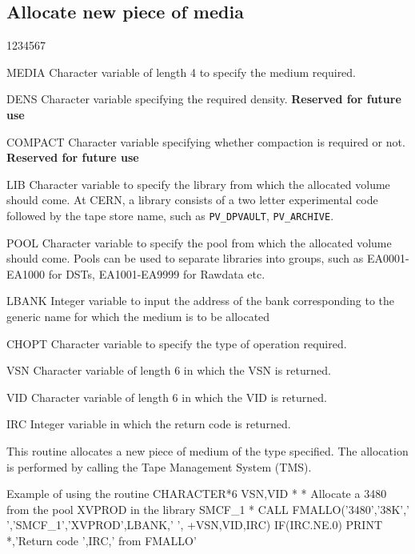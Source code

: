 \subsection{Allocate new piece of media}
\begin{DLtt}{1234567}
\item[MEDIA]
Character variable of length 4 to specify the medium required.
\item[DENS]
Character variable specifying the required density.
{\bf Reserved for future use}
\item[COMPACT]
Character variable specifying whether compaction is required or not.
{\bf Reserved for future use}
\item[LIB]
Character variable to specify the library from which
the allocated volume should come.
At CERN, a library consists of a two letter experimental code
followed by the tape store name, such as {\tt PV\_DPVAULT},
{\tt PV\_ARCHIVE}.
\item[POOL]
Character variable to specify the pool from which
the allocated volume should come.
Pools can be used to separate libraries into groups, such
as EA0001-EA1000 for DSTs, EA1001-EA9999 for Rawdata etc.
\item[LBANK]
Integer variable to input the address of the bank corresponding
to the generic name for which the medium is to be allocated
\item[CHOPT]
Character variable to specify the type of operation required.
\item[VSN]
Character variable of length 6 in which the VSN is returned.
\item[VID]
Character variable of length 6 in which the VID is returned.
\item[IRC]
Integer variable in which the return code is returned.
\end{DLtt}
\par
{}
This routine allocates a new piece of medium of the type
specified. The allocation is performed by calling the
Tape Management System (TMS).
\begin{XMPt}{Example of using the routine \protect{}}
      CHARACTER*6 VSN,VID
*
*     Allocate a 3480 from the pool XVPROD in the library SMCF_1
*
      CALL FMALLO('3480','38K',' ','SMCF_1','XVPROD',LBANK,' ',
     +VSN,VID,IRC)
      IF(IRC.NE.0) PRINT *,'Return code ',IRC,' from FMALLO'
\end{XMPt}
